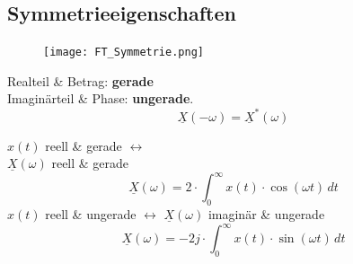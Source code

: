 \begin{multicols*}{2}
\subsection{Symmetrieeigenschaften}
\begin{mdframed}[style=exercise, nobreak=true]
	\begin{figure}
		\vspace{-1.4em}
		\texttt{[image: FT\_Symmetrie.png]}
	\end{figure}
	\setlength{\parindent}{0pt}
	Realteil \& Betrag: \textbf{gerade}\\
	Imaginärteil \& Phase: \textbf{ungerade}.
	\[
	\underline{X}(-\omega) = \underline{X}^*(\omega)
	\]
	
	$x(t)$ reell \& gerade $\leftrightarrow$\\ $\underline{X}(\omega)$  reell \& gerade
	$$\underline{X}(\omega) = 2 \cdot \int_0^\infty x(t) \cdot \cos(\omega t)\,dt$$
	$x(t)$ reell \& ungerade $\leftrightarrow$ $\underline{X}(\omega)$ imaginär \& ungerade
	$$\underline{X}(\omega) = -2j \cdot \int_0^\infty x(t) \cdot \sin(\omega t)\,dt$$
\end{mdframed}


\end{multicols*}

